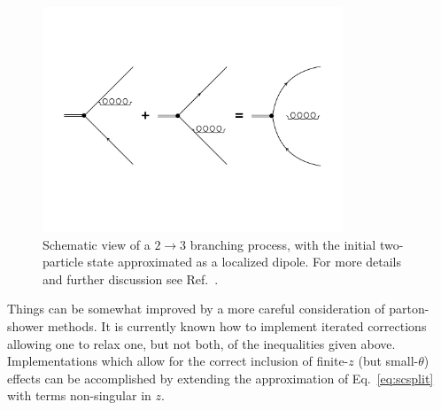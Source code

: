 \begin{figure}[tb!]
	\centering
	\includegraphics[width=0.8\textwidth]{figures/Two_to_Three_Dipole_Approx.pdf}
	\caption{Schematic view of a $2 \to 3$ branching process, with the initial two-particle state approximated as a localized dipole. For more details and further discussion see Ref.~\cite{Ellis:1991qj}.}
	\label{fig:dipoleant}
\end{figure}

Things can be somewhat improved by a more careful consideration of parton-shower methods. It is currently known how to implement iterated corrections allowing one to relax one, but not both, of the inequalities given above. Implementations which allow for the correct inclusion of finite-$z$ (but small-$\theta$) effects can be accomplished by extending the approximation of Eq.~\eqref{eq:scsplit} with terms non-singular in $z$.

